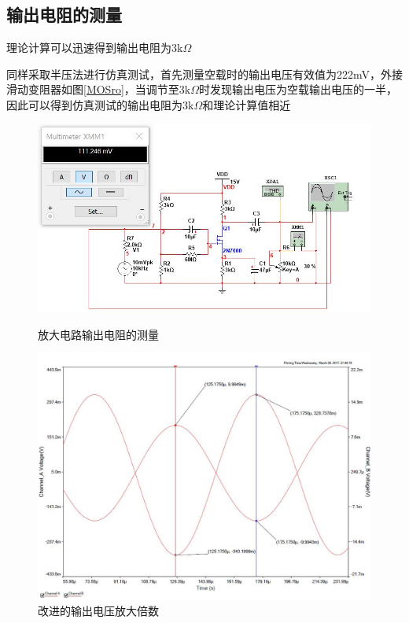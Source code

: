 \documentclass[UTF8,a4paper]{ctexart}
\begin{document}
\subsection{输出电阻的测量}
理论计算可以迅速得到输出电阻为$3\mathrm{k}\Omega$

同样采取半压法进行仿真测试，首先测量空载时的输出电压有效值为222mV，外接滑动变阻器如图\ref{MOSro}，当调节至3$\mathrm{k}\Omega$时发现输出电压为空载输出电压的一半，因此可以得到仿真测试的输出电阻为3$\mathrm{k}\Omega$和理论计算值相近
\begin{figure}
\centering
\includegraphics[width=\textwidth]{2-4Ro.jpg}
\caption{放大电路输出电阻的测量}
\label{MOSro}
\includegraphics[width=\textwidth]{2-4AA.jpg}
\caption{改进的输出电压放大倍数}
\label{AAA}
\end{figure}
\end{document}
